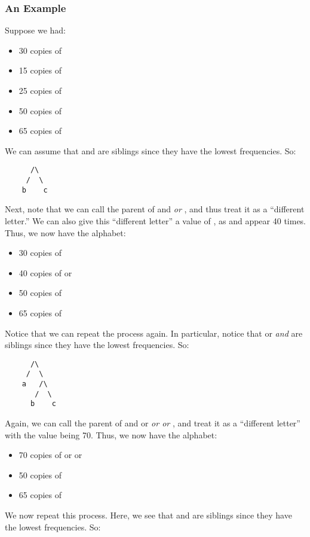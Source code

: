 \documentclass[letterpaper]{article}
\begin{document}
\subsubsection{An Example}
Suppose we had: 
\begin{itemize}
    \item 30 copies of 
    \item 15 copies of 
    \item 25 copies of 
    \item 50 copies of 
    \item 65 copies of 
\end{itemize}
We can assume that  and  are siblings since they have the lowest frequencies. So: 
\begin{verbatim}
      /\ 
     /  \ 
    b    c
\end{verbatim}
Next, note that we can call the parent of  and  \emph{ or }, and thus treat it as a ``different letter.'' We can also give this ``different letter'' a value of , as  and  appear 40 times. Thus, we now have the alphabet:
\begin{itemize}
    \item 30 copies of \code{a}
    \item 40 copies of  or 
    \item 50 copies of \code{d}
    \item 65 copies of \code{e}
\end{itemize}
Notice that we can repeat the process again. In particular, notice that  or  \emph{and}  are siblings since they have the lowest frequencies. So: 
\begin{verbatim}
      /\ 
     /  \ 
    a   /\ 
       /  \ 
      b    c
\end{verbatim}
Again, we can call the parent of  and  or  \emph{ or  or }, and treat it as a ``different letter'' with the value being 70. Thus, we now have the alphabet:
\begin{itemize}
    \item 70 copies of  or  or 
    \item 50 copies of 
    \item 65 copies of 
\end{itemize}
We now repeat this process. Here, we see that \code{d} and \code{e} are siblings since they have the lowest frequencies. So: 
\end{document}
